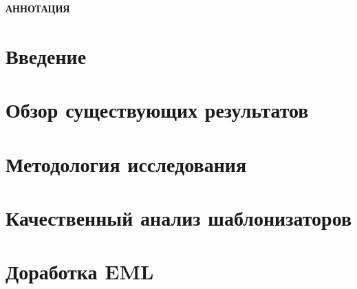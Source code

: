 





\newpage
\begin{center}
  \textbf{\large АННОТАЦИЯ}
  
\end{center}


\newpage
\tableofcontents


% 

\setcounter{page}{2}

\section*{Введение}


% 

\newpage
\section{Обзор существующих результатов}


\newpage
\section{Методология исследования}


\newpage
\section{Качественный анализ шаблонизаторов}


\newpage
\section{Доработка EML}


